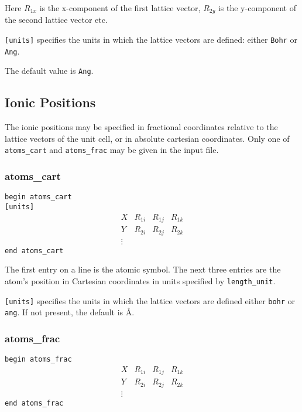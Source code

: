 Here $R_{1x}$ is the x-component of the first lattice vector,
$R_{2y}$ is the y-component of the second lattice vector etc.

\verb#[units]# specifies the units in which the lattice vectors are
defined: either \verb#Bohr# or \verb#Ang#. 

The default value is \verb#Ang#.



\subsection[Ionic Positions]{Ionic Positions}

The ionic positions may be specified in fractional coordinates relative
to the lattice vectors of the unit cell, or in absolute cartesian coordinates.
Only one of \verb#atoms_cart# and \verb#atoms_frac# may be given in the input
file.


\subsubsection{atoms\_cart}

\noindent \verb#begin atoms_cart# \\
\verb#[units]#
$$
\begin{array}{cccc}
X  & R_{1i} & R_{1j} & R_{1k} \\
Y  & R_{2i} & R_{2j} & R_{2k} \\
\vdots
\end{array}
$$
\verb#end atoms_cart#


The first entry on a line is the atomic symbol. The next three entries
are the atom's position in Cartesian coordinates in units specified by
\verb#length_unit#.

\verb#[units]# specifies the units in which the lattice vectors are
defined either \verb#bohr# or \verb#ang#. If not present, the default is \AA.

\subsubsection{atoms\_frac}

\noindent \verb#begin atoms_frac#
$$
\begin{array}{cccc}
X  & R_{1i} & R_{1j} & R_{1k} \\
Y  & R_{2i} & R_{2j} & R_{2k} \\
\vdots
\end{array}
$$
\verb#end atoms_frac#

